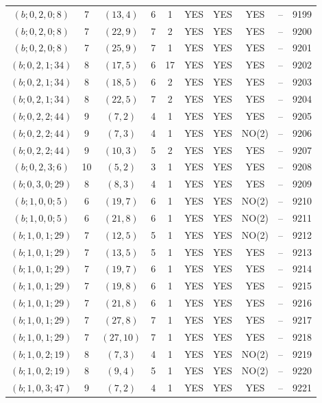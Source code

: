 \begin{longtable}{|c|c|c|c|c|c|c|c|c|c|}
$(b; 0, 2, 0; 8)$ & 7 & $(13, 4)$ & 6 & 1 & YES & YES & YES & -- & 9199\\
$(b; 0, 2, 0; 8)$ & 7 & $(22, 9)$ & 7 & 2 & YES & YES & YES & -- & 9200\\
$(b; 0, 2, 0; 8)$ & 7 & $(25, 9)$ & 7 & 1 & YES & YES & YES & -- & 9201\\
$(b; 0, 2, 1; 34)$ & 8 & $(17, 5)$ & 6 & 17 & YES & YES & YES & -- & 9202\\
$(b; 0, 2, 1; 34)$ & 8 & $(18, 5)$ & 6 & 2 & YES & YES & YES & -- & 9203\\
$(b; 0, 2, 1; 34)$ & 8 & $(22, 5)$ & 7 & 2 & YES & YES & YES & -- & 9204\\
$(b; 0, 2, 2; 44)$ & 9 & $(7, 2)$ & 4 & 1 & YES & YES & YES & -- & 9205\\
$(b; 0, 2, 2; 44)$ & 9 & $(7, 3)$ & 4 & 1 & YES & YES & NO(2) & -- & 9206\\
$(b; 0, 2, 2; 44)$ & 9 & $(10, 3)$ & 5 & 2 & YES & YES & YES & -- & 9207\\
$(b; 0, 2, 3; 6)$ & 10 & $(5, 2)$ & 3 & 1 & YES & YES & YES & -- & 9208\\
$(b; 0, 3, 0; 29)$ & 8 & $(8, 3)$ & 4 & 1 & YES & YES & YES & -- & 9209\\
$(b; 1, 0, 0; 5)$ & 6 & $(19, 7)$ & 6 & 1 & YES & YES & NO(2) & -- & 9210\\
$(b; 1, 0, 0; 5)$ & 6 & $(21, 8)$ & 6 & 1 & YES & YES & NO(2) & -- & 9211\\
$(b; 1, 0, 1; 29)$ & 7 & $(12, 5)$ & 5 & 1 & YES & YES & NO(2) & -- & 9212\\
$(b; 1, 0, 1; 29)$ & 7 & $(13, 5)$ & 5 & 1 & YES & YES & YES & -- & 9213\\
$(b; 1, 0, 1; 29)$ & 7 & $(19, 7)$ & 6 & 1 & YES & YES & YES & -- & 9214\\
$(b; 1, 0, 1; 29)$ & 7 & $(19, 8)$ & 6 & 1 & YES & YES & YES & -- & 9215\\
$(b; 1, 0, 1; 29)$ & 7 & $(21, 8)$ & 6 & 1 & YES & YES & YES & -- & 9216\\
$(b; 1, 0, 1; 29)$ & 7 & $(27, 8)$ & 7 & 1 & YES & YES & YES & -- & 9217\\
$(b; 1, 0, 1; 29)$ & 7 & $(27, 10)$ & 7 & 1 & YES & YES & YES & -- & 9218\\
$(b; 1, 0, 2; 19)$ & 8 & $(7, 3)$ & 4 & 1 & YES & YES & NO(2) & -- & 9219\\
$(b; 1, 0, 2; 19)$ & 8 & $(9, 4)$ & 5 & 1 & YES & YES & NO(2) & -- & 9220\\
$(b; 1, 0, 3; 47)$ & 9 & $(7, 2)$ & 4 & 1 & YES & YES & YES & -- & 9221\\

\end{longtable}
